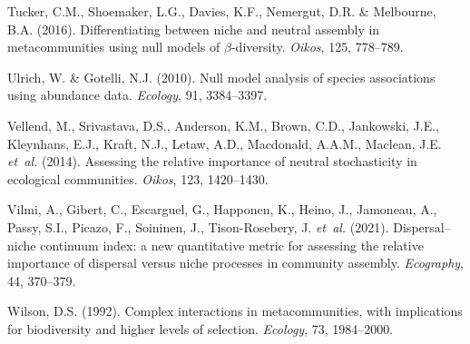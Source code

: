\begin{thebibliography}{70}
	Tucker, C.M., Shoemaker, L.G., Davies, K.F., Nemergut, D.R. \& Melbourne, B.A.
	(2016).
	\newblock Differentiating between niche and neutral assembly in metacommunities
	using null models of $\beta$-diversity.
	\newblock \emph{Oikos}, 125, 778--789.
	
	Ulrich, W. \& Gotelli, N.J. (2010).
	\newblock Null model analysis of species associations using abundance data.
	\newblock \emph{Ecology}, 91, 3384--3397.
	
	Vellend, M., Srivastava, D.S., Anderson, K.M., Brown, C.D., Jankowski, J.E.,
	Kleynhans, E.J., Kraft, N.J., Letaw, A.D., Macdonald, A.A.M., Maclean, J.E.
	\emph{et~al.} (2014).
	\newblock Assessing the relative importance of neutral stochasticity in
	ecological communities.
	\newblock \emph{Oikos}, 123, 1420--1430.
	
	Vilmi, A., Gibert, C., Escarguel, G., Happonen, K., Heino, J., Jamoneau, A.,
	Passy, S.I., Picazo, F., Soininen, J., Tison-Rosebery, J. \emph{et~al.}
	(2021).
	\newblock Dispersal--niche continuum index: a new quantitative metric for
	assessing the relative importance of dispersal versus niche processes in
	community assembly.
	\newblock \emph{Ecography}, 44, 370--379.
	
	Wilson, D.S. (1992).
	\newblock Complex interactions in metacommunities, with implications for
	biodiversity and higher levels of selection.
	\newblock \emph{Ecology}, 73, 1984--2000.
	
\end{thebibliography}

